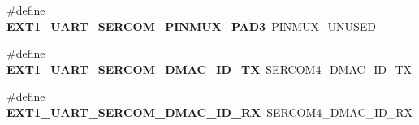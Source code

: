 \begin{DoxyCompactItemize}
\item 
\hypertarget{group__saml21__xplained__pro__features__group_gab17cebde86abeb0d1389a41f0435ddb9}{}\#define {\bfseries E\+X\+T1\+\_\+\+U\+A\+R\+T\+\_\+\+S\+E\+R\+C\+O\+M\+\_\+\+P\+I\+N\+M\+U\+X\+\_\+\+P\+A\+D3}~\hyperlink{group__asfdoc__sam0__sercom__usart__group_gaffde9ff712058ef836127e1f3368889e}{P\+I\+N\+M\+U\+X\+\_\+\+U\+N\+U\+S\+E\+D}\label{group__saml21__xplained__pro__features__group_gab17cebde86abeb0d1389a41f0435ddb9}

\item 
\hypertarget{group__saml21__xplained__pro__features__group_gaff51606cf087bc4be8d0386bb075ee23}{}\#define {\bfseries E\+X\+T1\+\_\+\+U\+A\+R\+T\+\_\+\+S\+E\+R\+C\+O\+M\+\_\+\+D\+M\+A\+C\+\_\+\+I\+D\+\_\+\+T\+X}~S\+E\+R\+C\+O\+M4\+\_\+\+D\+M\+A\+C\+\_\+\+I\+D\+\_\+\+T\+X\label{group__saml21__xplained__pro__features__group_gaff51606cf087bc4be8d0386bb075ee23}

\item 
\hypertarget{group__saml21__xplained__pro__features__group_ga875a6f3fcbe68f46f4af06292d71cd73}{}\#define {\bfseries E\+X\+T1\+\_\+\+U\+A\+R\+T\+\_\+\+S\+E\+R\+C\+O\+M\+\_\+\+D\+M\+A\+C\+\_\+\+I\+D\+\_\+\+R\+X}~S\+E\+R\+C\+O\+M4\+\_\+\+D\+M\+A\+C\+\_\+\+I\+D\+\_\+\+R\+X\label{group__saml21__xplained__pro__features__group_ga875a6f3fcbe68f46f4af06292d71cd73}

\end{DoxyCompactItemize}
